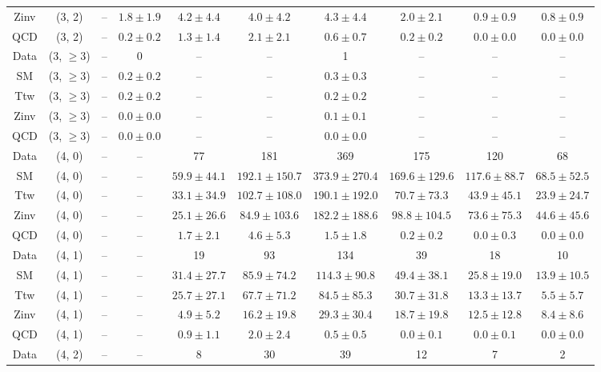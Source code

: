 \begin{table}[h!]
{\begin{tabular}{cccccccccc}
	Zinv & (3, 2) & -- & $1.8\pm 1.9$ & $4.2\pm 4.4$ & $4.0\pm 4.2$ & $4.3\pm 4.4$ & $2.0\pm 2.1$ & $0.9\pm 0.9$ & $0.8\pm 0.9$ \\[0.5ex] 
	QCD & (3, 2) & -- & $0.2\pm 0.2$ & $1.3\pm 1.4$ & $2.1\pm 2.1$ & $0.6\pm 0.7$ & $0.2\pm 0.2$ & $0.0\pm 0.0$ & $0.0\pm 0.0$ \\[0.5ex] 
	Data & (3, $\ge3$) & -- & 0 & -- & -- & 1 & -- & -- & -- \\[0.5ex] 
	SM & (3, $\ge3$) & -- & $0.2\pm 0.2$ & -- & -- & $0.3\pm 0.3$ & -- & -- & -- \\[0.5ex] 
	Ttw & (3, $\ge3$) & -- & $0.2\pm 0.2$ & -- & -- & $0.2\pm 0.2$ & -- & -- & -- \\[0.5ex] 
	Zinv & (3, $\ge3$) & -- & $0.0\pm 0.0$ & -- & -- & $0.1\pm 0.1$ & -- & -- & -- \\[0.5ex] 
	QCD & (3, $\ge3$) & -- & $0.0\pm 0.0$ & -- & -- & $0.0\pm 0.0$ & -- & -- & -- \\[0.5ex] 
	Data & (4, 0) & -- & -- & 77 & 181 & 369 & 175 & 120 & 68 \\[0.5ex] 
	SM & (4, 0) & -- & -- & $59.9\pm 44.1$ & $192.1\pm 150.7$ & $373.9\pm 270.4$ & $169.6\pm 129.6$ & $117.6\pm 88.7$ & $68.5\pm 52.5$ \\[0.5ex] 
	Ttw & (4, 0) & -- & -- & $33.1\pm 34.9$ & $102.7\pm 108.0$ & $190.1\pm 192.0$ & $70.7\pm 73.3$ & $43.9\pm 45.1$ & $23.9\pm 24.7$ \\[0.5ex] 
	Zinv & (4, 0) & -- & -- & $25.1\pm 26.6$ & $84.9\pm 103.6$ & $182.2\pm 188.6$ & $98.8\pm 104.5$ & $73.6\pm 75.3$ & $44.6\pm 45.6$ \\[0.5ex] 
	QCD & (4, 0) & -- & -- & $1.7\pm 2.1$ & $4.6\pm 5.3$ & $1.5\pm 1.8$ & $0.2\pm 0.2$ & $0.0\pm 0.3$ & $0.0\pm 0.0$ \\[0.5ex] 
	Data & (4, 1) & -- & -- & 19 & 93 & 134 & 39 & 18 & 10 \\[0.5ex] 
	SM & (4, 1) & -- & -- & $31.4\pm 27.7$ & $85.9\pm 74.2$ & $114.3\pm 90.8$ & $49.4\pm 38.1$ & $25.8\pm 19.0$ & $13.9\pm 10.5$ \\[0.5ex] 
	Ttw & (4, 1) & -- & -- & $25.7\pm 27.1$ & $67.7\pm 71.2$ & $84.5\pm 85.3$ & $30.7\pm 31.8$ & $13.3\pm 13.7$ & $5.5\pm 5.7$ \\[0.5ex] 
	Zinv & (4, 1) & -- & -- & $4.9\pm 5.2$ & $16.2\pm 19.8$ & $29.3\pm 30.4$ & $18.7\pm 19.8$ & $12.5\pm 12.8$ & $8.4\pm 8.6$ \\[0.5ex] 
	QCD & (4, 1) & -- & -- & $0.9\pm 1.1$ & $2.0\pm 2.4$ & $0.5\pm 0.5$ & $0.0\pm 0.1$ & $0.0\pm 0.1$ & $0.0\pm 0.0$ \\[0.5ex] 
	Data & (4, 2) & -- & -- & 8 & 30 & 39 & 12 & 7 & 2 \\[0.5ex] 

\end{tabular}}
\end{table}

